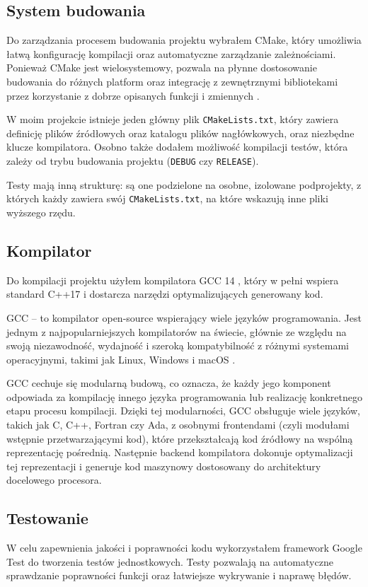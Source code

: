 \subsection{System budowania}
Do zarządzania procesem budowania projektu wybrałem CMake, który umożliwia łatwą konfigurację kompilacji oraz automatyczne zarządzanie zależnościami. Ponieważ CMake jest wielosystemowy, pozwala na płynne dostosowanie budowania do różnych platform oraz integrację z zewnętrznymi bibliotekami przez korzystanie z dobrze opisanych funkcji i zmiennych \cite{cmake}.

W moim projekcie istnieje jeden główny plik \texttt{CMakeLists.txt}, który zawiera definicję plików źródłowych oraz katalogu plików nagłówkowych, oraz niezbędne klucze kompilatora. Osobno także dodałem możliwość kompilacji testów, która zależy od trybu budowania projektu (\texttt{DEBUG} czy \texttt{RELEASE}).

Testy mają inną strukturę: są one podzielone na osobne, izolowane podprojekty, z których każdy zawiera swój \texttt{CMakeLists.txt}, na które wskazują inne pliki wyższego rzędu.

\subsection{Kompilator}
Do kompilacji projektu użyłem kompilatora GCC 14 \cite{gcc_14}, który w pełni wspiera standard C++17 i dostarcza narzędzi optymalizujących generowany kod.

GCC  -- to kompilator open-source wspierający wiele języków programowania. Jest jednym z najpopularniejszych kompilatorów na świecie, głównie ze względu na swoją niezawodność, wydajność i szeroką kompatybilność z różnymi systemami operacyjnymi, takimi jak Linux, Windows i macOS \cite{gcc}. 

GCC cechuje się modularną budową, co oznacza, że każdy jego komponent odpowiada za kompilację innego języka programowania lub realizację konkretnego etapu procesu kompilacji. Dzięki tej modularności, GCC obsługuje wiele języków, takich jak C, C++, Fortran czy Ada, z osobnymi frontendami (czyli modułami wstępnie przetwarzającymi kod), które przekształcają kod źródłowy na wspólną reprezentację pośrednią. Następnie backend kompilatora dokonuje optymalizacji tej reprezentacji i generuje kod maszynowy dostosowany do architektury docelowego procesora.

\subsection{Testowanie}
W celu zapewnienia jakości i poprawności kodu wykorzystałem framework Google Test do tworzenia testów jednostkowych. Testy pozwalają na automatyczne sprawdzanie poprawności funkcji oraz łatwiejsze wykrywanie i naprawę błędów.

